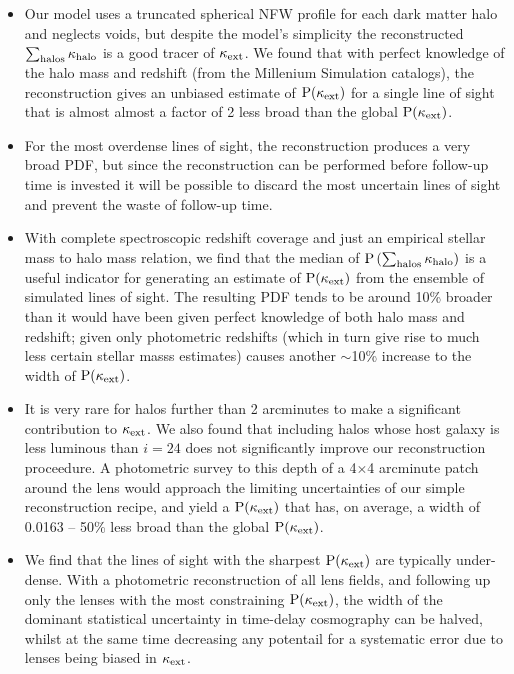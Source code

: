 \documentclass[useAMS,usenatbib]{mn2e}
\begin{document}
\begin{itemize} 

\item Our model uses a truncated spherical NFW profile for
each dark matter halo and neglects voids, but despite the model's simplicity
the reconstructed $\sum_{\rm halos} \kappa_{\rm halo}$ is a good tracer of $\kappa_{\rm ext}$.  We found that
with perfect knowledge of the halo mass and redshift (from the Millenium
Simulation catalogs), the reconstruction gives an unbiased estimate of
${\rm P}(\kappa_{\rm ext})$ for a single line of sight that is almost almost a factor of 2
less broad than the global ${\rm P}(\kappa_{\rm ext})$. 

\item  For the most overdense lines of sight, the reconstruction produces a
very broad PDF, but since the reconstruction can be performed before follow-up
time is invested it will be possible to discard the most uncertain lines of
sight and prevent the waste of follow-up time. 

\item With complete spectroscopic redshift coverage and just an empirical
stellar mass to halo mass relation, we find that the median of
${\rm P}\left(\sum_{\rm halos} \kappa_{\rm halo}\right)$ is a useful indicator for generating an estimate
of ${\rm P}(\kappa_{\rm ext})$ from the ensemble of simulated lines of sight. The resulting
PDF tends to be around 10\% broader than it would have been given perfect
knowledge of both halo mass and redshift; given only photometric redshifts
(which in turn give rise to much less certain stellar masss estimates) causes
another $\sim$10\% increase to the width of ${\rm P}(\kappa_{\rm ext})$.

\item It is very rare for halos further than 2 arcminutes to make a
significant contribution to $\kappa_{\rm ext}$. We also found that including halos
whose host galaxy is less luminous than $i=24$ does not significantly improve
our reconstruction proceedure. A photometric survey to this depth of a
4$\times$4 arcminute patch around the lens would approach the limiting
uncertainties of our simple reconstruction recipe, and yield a 
${\rm P}(\kappa_{\rm ext})$ that has, on average, a width of 0.0163 --
50\% less broad than the global ${\rm P}(\kappa_{\rm ext})$.

\item We find that the lines of sight with the sharpest ${\rm P}(\kappa_{\rm ext})$ are
typically under-dense. With a photometric reconstruction of all lens fields,
and following up only the lenses with the most constraining ${\rm P}(\kappa_{\rm ext})$,
the width of the dominant statistical uncertainty in time-delay cosmography
can be halved, whilst at the same time decreasing any potentail for a
systematic error due to lenses being biased in $\kappa_{\rm ext}$.

\end{itemize}
\end{document}
